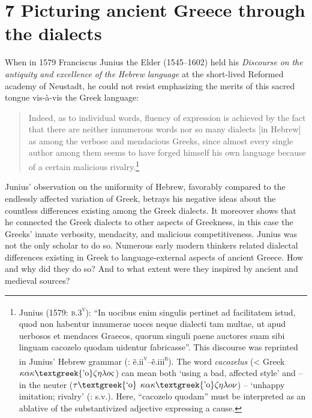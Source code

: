 \section{\textsc{7} Picturing ancient Greece through the dialects}
\hypertarget{Toc19704849}{}
When in 1579 Franciscus Junius the Elder (1545–1602) held his \textit{Discourse} \textit{on} \textit{the} \textit{antiquity} \textit{and} \textit{excellence} \textit{of} \textit{the} \textit{Hebrew} \textit{language} at the short-lived Reformed academy of Neustadt, he could not resist emphasizing the merits of this sacred tongue vis-à-vis the Greek language:

\begin{quote}
Indeed, as to individual words, fluency of expression is achieved by the fact that there are neither innumerous words nor so many dialects [in Hebrew] as among the verbose and mendacious Greeks, since almost every single author among them seems to have forged himself his own language because of a certain malicious rivalry.\footnote{Junius (1579: \textsc{b.3}\textsc{\textsuperscript{v}}): “In uocibus enim singulis pertinet ad facilitatem istud, quod non habentur innumerae uoces neque dialecti tam multae, ut apud uerbosos et mendaces Graecos, quorum singuli paene auctores suam sibi linguam cacozelo quodam uidentur fabricasse”. This discourse was reprinted in Junius’ Hebrew grammar (\citealt{Junius1580}: ẽ.ii\textsc{\textsuperscript{v}}–ẽ.iii\textsc{\textsuperscript{r}}). The word \textit{cacozelus} (< Greek $\kappa \alpha \kappa \text{\textgreek{'o}}\zeta \eta \lambda o\varsigma $) can mean both ‘using a bad, affected style’ and – in the neuter ($\tau \text{\textgreek{`o}}$ $\kappa \alpha \kappa \text{\textgreek{'o}}\zeta \eta \lambda o\nu $) – ‘unhappy imitation; rivalry’ (\citealt{LiddellScott1940}: s.v.). Here, “cacozelo quodam” must be interpreted as an ablative of the substantivized adjective expressing a cause.}
\end{quote}

Junius’ observation on the uniformity of Hebrew, favorably compared to the endlessly affected variation of Greek, betrays his negative ideas about the countless differences existing among the Greek dialects. It moreover shows that he connected the Greek dialects to other aspects of Greekness, in this case the Greeks’ innate verbosity, mendacity, and malicious competitiveness. Junius was not the only scholar to do so. Numerous early modern thinkers related dialectal differences existing in Greek to language-external aspects of ancient Greece. How and why did they do so? And to what extent were they inspired by ancient and medieval sources?

